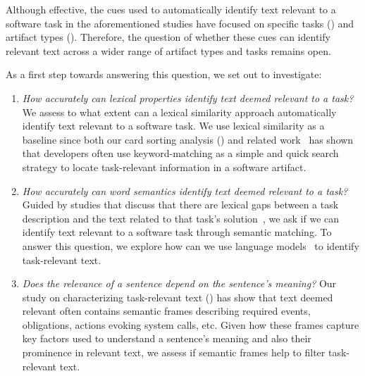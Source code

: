 Although effective, the cues used to automatically identify text relevant to a software task in the aforementioned studies have focused on specific tasks () and artifact types ().
Therefore, the question of whether these cues can identify relevant text across a wider range of artifact types and tasks remains open. 


As a first step towards answering this question, we set out to investigate:


\begin{enumerate}
    \item \textit{How accurately can lexical properties identify text deemed relevant to a task?}
    We assess to what extent can a lexical similarity approach automatically identify text relevant to a software task.
    We use lexical similarity as a baseline since both our card sorting analysis () and related work~\cite{Ko2006a, Freund2015} has shown
    that developers often use keyword-matching as a simple and quick search strategy to locate task-relevant information in a software artifact.


    \item \textit{How accurately can word semantics identify text deemed relevant to a task?}
    Guided by studies that discuss that there are lexical gaps between a task description and the text related to that task's solution~\cite{silva2019, Huang2018, Ye2016},
    we ask if we can identify text relevant to a software task through semantic matching.
    To answer this question, we explore how can we use language models~\cite{Devlin2018Bert, Mikolov2013} to identify  task-relevant text.

    
    \item \textit{Does the relevance of a sentence depend on the sentence's meaning?}
    Our study on characterizing task-relevant text () has show that text deemed relevant often contains semantic frames describing 
     required events, obligations, actions evoking system calls, etc.
    Given how these frames capture key factors used to understand a sentence's meaning
    and also their prominence in relevant text, 
    we assess if semantic frames help to filter task-relevant text.
\end{enumerate}


